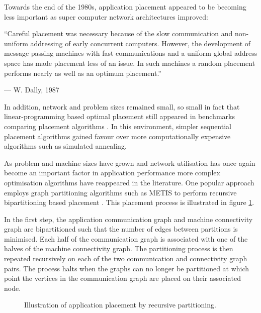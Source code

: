 				Towards the end of the 1980s, application placement appeared to be
				becoming less important as super computer network architectures
				improved:
				\begin{displayquote}
					``Careful placement was necessary because of the slow communication
					and non-uniform addressing of early concurrent computers. However,
					the development of message passing machines with fast communications
					and a uniform global address space  has made placement less of an
					issue. In such machines a random placement performs nearly as well as
					an optimum placement.''
					
					\noindent --- W. Dally, 1987 \cite{dally87}
				\end{displayquote}
				In addition, network and problem sizes remained small, so small in fact
				that linear-programming based optimal placement still appeared in
				benchmarks comparing placement algorithms \cite{xu91}. In this
				environment, simpler sequential placement algorithms gained favour over
				more computationally expensive algorithms such as simulated annealing.
				
				As problem and machine sizes have grown and network utilisation has
				once again become an important factor in application performance
				\cite{navaridas09b} more complex optimisation algorithms have
				reappeared in the literature. One popular approach employs graph
				partitioning algorithms such as METIS \cite{karypis98} to perform
				recursive bipartitioning based placement
				\cite{phillips14,hoefler11,pellegrini96}.  This placement process is
				illustrated in figure \ref{fig:partitioning}.
				
				In the first step, the application communication graph and machine
				connectivity graph are bipartitioned such that the number of edges
				between partitions is minimised. Each half of the communication graph
				is associated with one of the halves of the machine connectivity graph.
				The partitioning process is then repeated recursively on each of the
				two communication and connectivity graph pairs. The process halts when
				the graphs can no longer be partitioned at which point the vertices in
				the communication graph are placed on their associated node.
				
				\begin{figure}
					\center
					
					\caption{Illustration of application placement by recursive
					partitioning.}
					\label{fig:partitioning}
				\end{figure}
				

